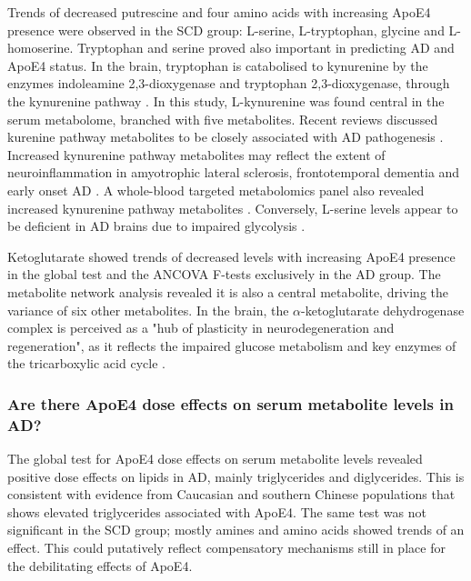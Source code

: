 \documentclass{amsart}
\begin{document}
Trends of decreased putrescine and four amino acids with increasing ApoE4 presence were observed in the SCD group: L-serine, L-tryptophan, glycine and L-homoserine. Tryptophan and serine proved also important in predicting AD and ApoE4 status. In the brain, tryptophan is catabolised to kynurenine by the enzymes indoleamine 2,3-dioxygenase and tryptophan 2,3-dioxygenase, through the kynurenine pathway \cite*{Liang2022KynureninePM}. In this study, L-kynurenine was found central in the serum metabolome, branched with five  metabolites. Recent reviews discussed kurenine pathway metabolites to be closely associated with AD pathogenesis \cite{Liang2022KynureninePM,Sharma2022KynurenineMA}. Increased kynurenine pathway metabolites may reflect the extent of neuroinflammation in amyotrophic lateral sclerosis, frontotemporal dementia and early onset AD \cite*{Heylen2023BrainKP}. A whole-blood targeted metabolomics panel also revealed increased kynurenine pathway metabolites \cite{Teruya2021WholebloodMO}. Conversely, L-serine levels appear to be deficient in AD brains due to impaired glycolysis \cite{LeDouce2020ImpairmentOG}. 

Ketoglutarate showed trends of decreased levels with increasing ApoE4 presence in the global test and the ANCOVA F-tests exclusively in the AD group. The metabolite network analysis revealed it is also a central metabolite, driving the variance of six other metabolites. In the brain, the $\alpha$-ketoglutarate dehydrogenase complex is perceived as a "hub of plasticity in neurodegeneration and regeneration", as it reflects the impaired glucose metabolism and key enzymes of the tricarboxylic acid cycle \cite*{Hansen2022TheD}.

\subsubsection{Are there ApoE4 dose effects on serum metabolite levels in AD?}
The global test for ApoE4 dose effects on serum metabolite levels revealed positive dose effects on lipids in AD, mainly triglycerides and diglycerides. This is consistent with evidence from Caucasian \cite{Maxwell2013APOEMT,CARVALHOWELLS20121447,Bernath2020SerumTI} and southern Chinese populations \cite{Gan2022EffectsPopulation} that shows elevated triglycerides associated with ApoE4. The same test was not significant in the SCD group; mostly amines and amino acids showed trends of an effect. This could putatively reflect compensatory mechanisms still in place for the debilitating effects of ApoE4.
\end{document}

